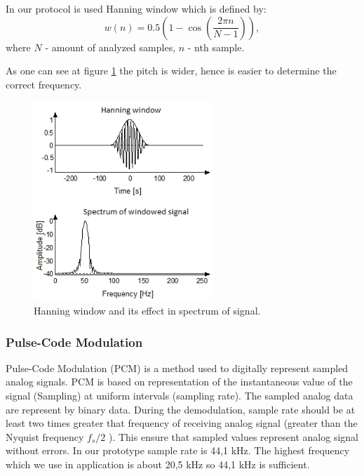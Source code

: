 \documentclass[11pt,titlepage]{article}
\theoremstyle{plain}
\begin{document}
\vspace{5mm}

In our protocol is used Hanning window which is defined by:
\begin{equation}
	 w(n) = 0.5 (1 - \cos\left(\frac{2 \pi n}{N - 1}\right)),
\end{equation}
\newline where $N$ - amount of analyzed samples, $n$ - nth sample. 

\vspace{5mm}

As one can see at figure \ref{fig:F10} the pitch is wider, hence is easier to determine the correct frequency.
\begin{figure}[H]
	\centering
	\includegraphics[width=0.6\textwidth]{img/hanning_window}
	\caption{Hanning window and its effect in spectrum of signal.}
	\label{fig:F10}
\end{figure}

\subsubsection{Pulse-Code Modulation}

Pulse-Code Modulation (PCM) is a method used to digitally represent sampled analog signals. PCM is based on representation of the instantaneous value of the signal (Sampling) at uniform intervals (sampling rate). The sampled analog data are represent by binary data. During the demodulation, sample rate should be at least two times greater that frequency of receiving analog signal (greater than the Nyquist frequency $f_s / 2$ ). This ensure that sampled values represent analog signal without errors. In our prototype sample rate is 44,1 kHz. The highest frequency which we use in application is about 20,5 kHz so 44,1 kHz is sufficient. 
\end{document}
